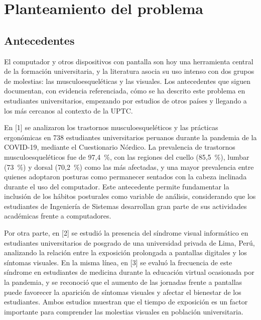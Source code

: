 
\section{Planteamiento del problema}

\subsection{Antecedentes}

El computador y otros dispositivos con pantalla son hoy una herramienta central de la
formación universitaria, y la literatura asocia su uso intenso con dos grupos de
molestias: las musculoesqueléticas y las visuales. Los antecedentes que siguen
documentan, con evidencia referenciada, cómo se ha descrito este problema en
estudiantes universitarios, empezando por estudios de otros países y llegando a los más
cercanos al contexto de la UPTC.

En [1] se analizaron los trastornos musculoesqueléticos y las prácticas ergonómicas en
738 estudiantes universitarios peruanos durante la pandemia de la COVID-19, mediante el
Cuestionario Nórdico. La prevalencia de trastornos musculoesqueléticos fue de 97,4~\%,
con las regiones del cuello (85,5~\%), lumbar (73~\%) y dorsal (70,2~\%) como las más
afectadas, y una mayor prevalencia entre quienes adoptaron posturas como permanecer
sentados con la cabeza inclinada durante el uso del computador. Este antecedente
permite fundamentar la inclusión de los hábitos posturales como variable de análisis,
considerando que los estudiantes de Ingeniería de Sistemas desarrollan gran parte de sus
actividades académicas frente a computadores.

Por otra parte, en [2] se estudió la presencia del síndrome visual informático en
estudiantes universitarios de posgrado de una universidad privada de Lima, Perú,
analizando la relación entre la exposición prolongada a pantallas digitales y los
síntomas visuales. En la misma línea, en [3] se evaluó la frecuencia de este síndrome en
estudiantes de medicina durante la educación virtual ocasionada por la pandemia, y se
reconoció que el aumento de las jornadas frente a pantallas puede favorecer la aparición
de síntomas visuales y afectar el bienestar de los estudiantes. Ambos estudios muestran
que el tiempo de exposición es un factor importante para comprender las molestias
visuales en población universitaria.

